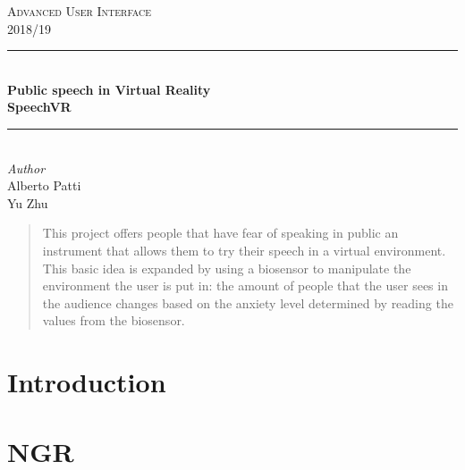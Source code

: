\documentclass[letterpaper,12pt]{article}
\begin{document}
\begin{titlepage} %
	\newcommand{\HRule}{\rule{\linewidth}{0.5mm}} %
	
	\center %
	
	
	\textsc{\LARGE Advanced User Interface}\\[0.5cm] %
	
	\textsc{\Large 2018/19}\\[0.5cm] %
	
	
	\HRule\\[0.4cm]
	
	{\huge\bfseries Public speech in Virtual Reality\\SpeechVR}\\[0.4cm] %
	
	\HRule\\[1cm]
	
	
	\large\textit{Author}\\[0.3cm]
	Alberto Patti\\
	Yu Zhu\\[1.5cm]
	

	\begin{abstract}
	This project offers people that have fear of speaking in public an instrument that allows them to try their speech in a virtual environment. This basic idea is expanded by using a biosensor to manipulate the environment the user is put in: the amount of people that the user sees in the audience changes based on the anxiety level determined by reading the values from the biosensor.
	\end{abstract}
\end{titlepage}

\tableofcontents
\pagebreak
\section{Introduction}
	
	\pagebreak

\section{NGR}
	
	\pagebreak
	
\end{document}
